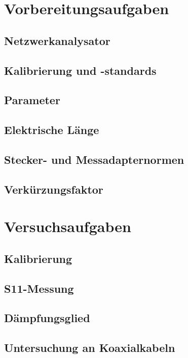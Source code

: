 \documentclass[a4paper, 12pt]{article}
\begin{document}
  
  \clearpage
  \setcounter{page}{1}

\section{Vorbereitungsaufgaben}

  \subsection{Netzwerkanalysator}
   

  \subsection{Kalibrierung und -standards}
   

  \subsection{Parameter}
  

  \subsection{Elektrische Länge}
  

  \subsection{Stecker- und Messadapternormen}
  

  \subsection{Verkürzungsfaktor}
  

\section{Versuchsaufgaben}

\subsection{Kalibrierung}


\subsection{S11-Messung}


\subsection{Dämpfungsglied}


\subsection{Untersuchung an Koaxialkabeln}

\end{document}
